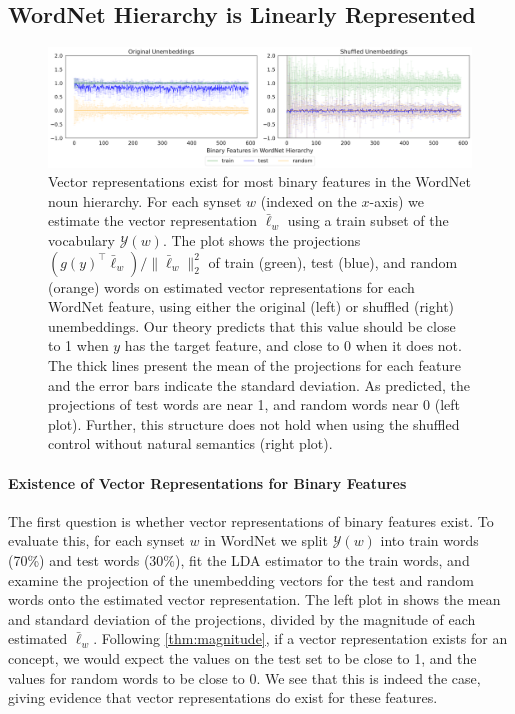 \documentclass{article}
\newcommand{\yquad}{\mathcal{Y}}
\begin{document}
\subsection{WordNet Hierarchy is Linearly Represented}

\begin{figure}[t]
  \centering
  \includegraphics[width=1.0\linewidth]{figures/eval_lda_noun_gemma.pdf}
  \caption{Vector representations exist for most binary features in the WordNet noun hierarchy.
  For each synset $w$ (indexed on the $x$-axis) we estimate the vector representation $\bar\ell_w$ using a train subset of the vocabulary $\yquad(w)$. The plot shows the projections $(g(y)^{\top}\bar\ell_w)/\|\bar\ell_w\|_2^2$ of train (green), test (blue), and random (orange) words on estimated vector representations for each WordNet feature, using either the original (left) or shuffled (right) unembeddings. 
  Our theory predicts that this value should be close to 1 when $y$ has the target feature, and close to 0 when it does not. 
  The thick lines present the mean of the projections for each feature and the error bars indicate the standard deviation.
  As predicted, the projections of test words are near 1, and random words near 0 (left plot). Further, this structure does not hold when using the shuffled control without natural semantics (right plot).}
  \label{fig:eval_lda_noun_gemma}
\end{figure}

\paragraph{Existence of Vector Representations for Binary Features}
The first question is whether vector representations of binary features exist.
To evaluate this, for each synset $w$ in WordNet we split $\yquad(w)$ into train words (70\%) and test words (30\%), fit the LDA estimator to the train words, and examine the projection of the unembedding vectors for the test and random words onto the estimated vector representation. The left plot in  shows the mean and standard deviation of the projections, divided by the magnitude of each estimated $\bar{\ell}_w$. 
Following \cref{thm:magnitude}, if a vector representation exists for an concept, we would expect the values on the test set to be close to 1, and the values for random words to be close to 0. 
We see that this is indeed the case, giving evidence that vector representations do exist for these features.
 
\end{document}
